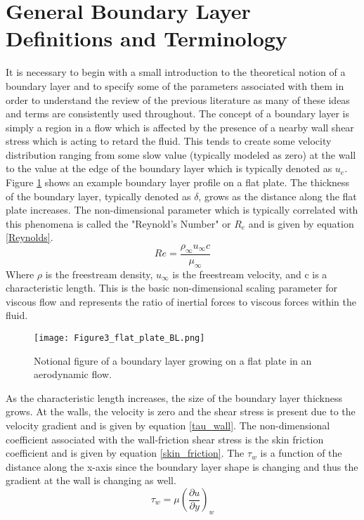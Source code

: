 \section{General Boundary Layer Definitions and Terminology}
It is necessary to begin with a small introduction to the theoretical notion of a boundary layer and to specify some of the parameters associated with them in order to understand the review of the previous literature as many of these ideas and terms are consistently used throughout.  The concept of a boundary layer is simply a region in a flow which is affected by the presence of a nearby wall shear stress which is acting to retard the fluid.  This tends to create some velocity distribution ranging from some slow value (typically modeled as zero) at the wall to the value at the edge of the boundary layer which is typically denoted as $u_e$.  Figure \ref{Flat_Plate} shows an example boundary layer profile on a flat plate.  The thickness of the boundary layer, typically denoted as $\delta$, grows as the distance along the flat plate increases.  The non-dimensional parameter which is typically correlated with this phenomena is called the "Reynold's Number" or $R_e$ and is given by equation \ref{Reynolds}.  
\begin{equation} Re = \frac{{\rho_\infty} u_\infty c}{\mu_\infty}\label{Reynolds}\end{equation}
Where $\rho$ is the freestream density, $u_\infty$ is the freestream velocity, and c is a characteristic length.  This is the basic non-dimensional scaling parameter for viscous flow and represents the ratio of inertial forces to viscous forces within the fluid.  
\begin{figure}[htpb]
\centering
\texttt{[image: Figure3\_flat\_plate\_BL.png]}
\caption{Notional figure of a boundary layer growing on a flat plate in an aerodynamic flow.}
\label{Flat_Plate}
\end{figure}
As the characteristic length increases, the size of the boundary layer thickness grows.  At the walls, the velocity is zero and the shear stress is present due to the velocity gradient and is given by equation \ref{tau_wall}.  The non-dimensional coefficient associated with the wall-friction shear stress is the skin friction coefficient and is given by equation \ref{skin_friction}.   The $\tau_w$ is a function of the distance along the x-axis since the boundary layer shape is changing and thus the gradient at the wall is changing as well.
% 
\begin{equation} \tau_w = \mu \left(\frac{\partial u}{\partial y}\right)_w\label{tau_wall}\end{equation}
